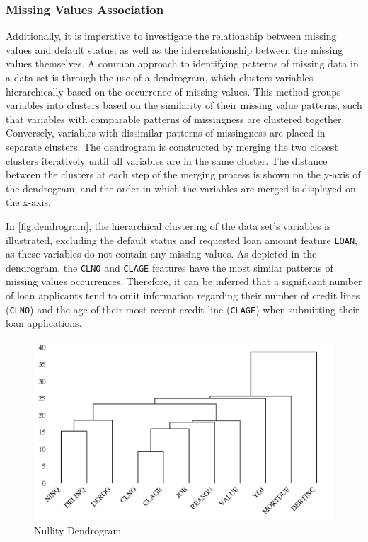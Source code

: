 \subsubsection{Missing Values Association}
\label{subsubsec:naass}
Additionally, it is imperative to investigate the relationship between missing values and default status, as well as the interrelationship between the missing values themselves.
A common approach to identifying patterns of missing data in a data set is through the use of a dendrogram, which clusters variables hierarchically based on the occurrence of missing values.
This method groups variables into clusters based on the similarity of their missing value patterns, such that variables with comparable patterns of missingness are clustered together.
Conversely, variables with dissimilar patterns of missingness are placed in separate clusters.
The dendrogram is constructed by merging the two closest clusters iteratively until all variables are in the same cluster.
The distance between the clusters at each step of the merging process is shown on the y-axis of the dendrogram, and the order in which the variables are merged is displayed on the x-axis.

In \autoref{fig:dendrogram}, the hierarchical clustering of the data set's variables is illustrated, excluding the default status and requested loan amount feature \texttt{LOAN}, as these variables do not contain any missing values.
As depicted in the dendrogram, the \texttt{CLNO} and \texttt{CLAGE} features have the most similar patterns of missing values occurrences.
Therefore, it can be inferred that a significant number of loan applicants tend to omit information regarding their number of credit lines (\texttt{CLNO}) and the age of their most recent credit line (\texttt{CLAGE}) when submitting their loan applications.

\begin{figure}[H]
    \centering
    \caption{Nullity Dendrogram}\vspace{0.5em}
    \label{fig:dendrogram}
    \includegraphics[width=140mm]{Figures/NA_Dendrogram.jpg}

    \vspace{-1em}
\end{figure}

